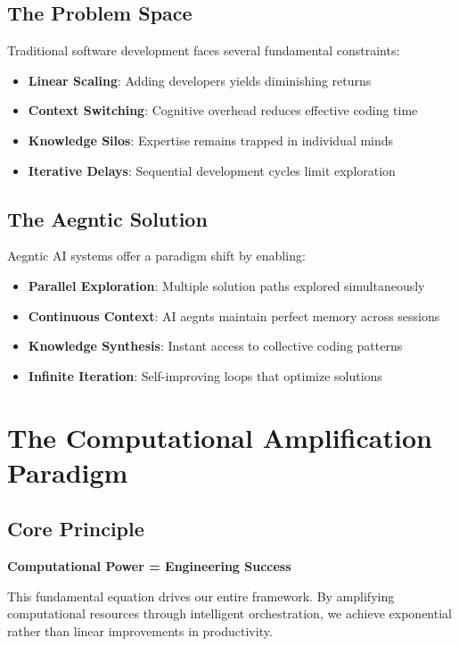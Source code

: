 \documentclass[11pt]{article}
\begin{document}
\subsection{The Problem Space}

Traditional software development faces several fundamental constraints:

\begin{itemize}[noitemsep]
\item \textbf{Linear Scaling}: Adding developers yields diminishing returns
\item \textbf{Context Switching}: Cognitive overhead reduces effective coding time
\item \textbf{Knowledge Silos}: Expertise remains trapped in individual minds
\item \textbf{Iterative Delays}: Sequential development cycles limit exploration
\end{itemize}

\subsection{The Aegntic Solution}

Aegntic AI systems offer a paradigm shift by enabling:

\begin{itemize}[noitemsep]
\item \textbf{Parallel Exploration}: Multiple solution paths explored simultaneously
\item \textbf{Continuous Context}: AI aegnts maintain perfect memory across sessions
\item \textbf{Knowledge Synthesis}: Instant access to collective coding patterns
\item \textbf{Infinite Iteration}: Self-improving loops that optimize solutions
\end{itemize}

\section{The Computational Amplification Paradigm}

\subsection{Core Principle}

\textbf{Computational Power = Engineering Success}

This fundamental equation drives our entire framework. By amplifying computational resources through intelligent orchestration, we achieve exponential rather than linear improvements in productivity.
\end{document}
